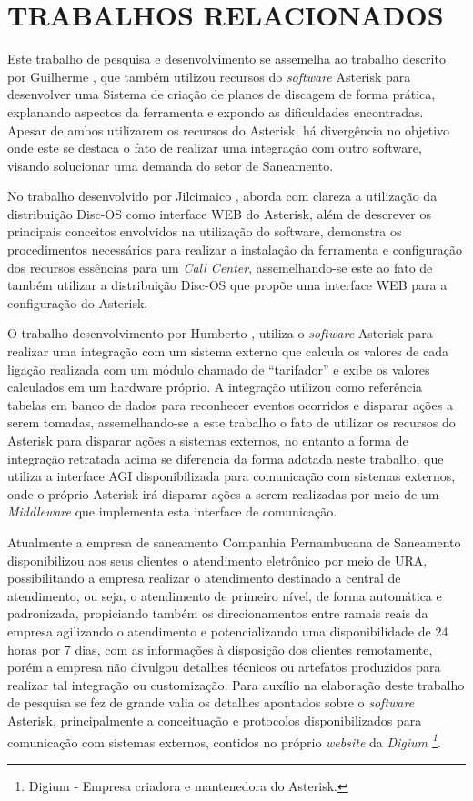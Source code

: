\section{\textbf{TRABALHOS RELACIONADOS}}
Este trabalho de pesquisa e desenvolvimento se assemelha ao trabalho descrito por Guilherme \cite{VIEIRA:2007}, que também utilizou recursos do \textit{software} Asterisk para desenvolver uma Sistema de criação de planos de discagem de forma prática, explanando aspectos da ferramenta e expondo as dificuldades encontradas. Apesar de ambos utilizarem os recursos do Asterisk, há divergência no objetivo onde este se destaca o fato de realizar uma integração com outro software, visando solucionar uma demanda do setor de Saneamento.

No trabalho desenvolvido por Jilcimaico \cite{DARU:2008}, aborda com clareza a utilização da distribuição Disc-OS como interface WEB do Asterisk, além de descrever os principais conceitos envolvidos na utilização do software, demonstra os procedimentos necessários para realizar a instalação da ferramenta e configuração dos recursos essências para um \textit{Call Center}, assemelhando-se este ao fato de também utilizar a distribuição Disc-OS que propõe uma interface WEB para a configuração do Asterisk.

O trabalho desenvolvimento por Humberto \cite{CAMPOS:2007}, utiliza o \textit{software} Asterisk para realizar uma integração com um sistema externo que calcula os valores de cada ligação realizada com um módulo chamado de “tarifador” e exibe os valores calculados em um hardware próprio. A integração utilizou como referência tabelas em banco de dados para reconhecer eventos ocorridos e disparar ações a serem tomadas, assemelhando-se a este trabalho o fato de utilizar os recursos do Asterisk para disparar ações a sistemas externos, no entanto a forma de integração retratada acima se diferencia da forma adotada neste trabalho, que utiliza a interface AGI disponibilizada para comunicação com sistemas externos, onde o próprio Asterisk irá disparar ações a serem realizadas por meio de um \textit{Middleware} que implementa esta interface de comunicação.

Atualmente a empresa de saneamento Companhia Pernambucana de Saneamento \cite{COMPESA:URA} disponibilizou aos seus clientes o atendimento eletrônico por meio de URA, possibilitando a empresa realizar o atendimento destinado a central de atendimento, ou seja, o atendimento de primeiro nível, de forma automática e padronizada, propiciando também os direcionamentos entre ramais reais da empresa agilizando o atendimento e potencializando uma disponibilidade de 24 horas por 7 dias, com as informações à disposição dos clientes remotamente, porém a empresa não divulgou detalhes técnicos ou artefatos produzidos para realizar tal integração ou customização.
Para auxílio na elaboração deste trabalho de pesquisa se fez de grande valia os detalhes apontados sobre o \textit{software} Asterisk, principalmente a conceituação e protocolos disponibilizados para comunicação com sistemas externos, contidos no próprio \textit{website} da \textit{Digium \footnote{Digium - Empresa criadora e mantenedora do Asterisk.}}. 

